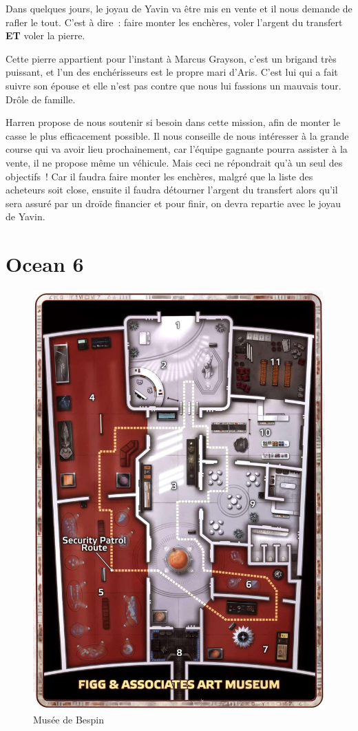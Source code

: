 \documentclass[a4paper,9pt,twoside,twocolumn,openany]{book}
\begin{document}
Dans quelques jours, le joyau de Yavin va être mis en vente et il nous demande de rafler le tout. C'est à dire\ : faire monter les enchères, voler l'argent du transfert \textbf{ET} voler la pierre.

Cette pierre appartient pour l'instant à Marcus Grayson, c'est un brigand très puissant, et l'un des enchérisseurs est le propre mari d’Aris. C'est lui qui a fait suivre son épouse et elle n'est pas contre que nous lui fassions un mauvais tour. Drôle de famille.

Harren propose de nous soutenir si besoin dans cette mission, afin de monter le casse le plus efficacement possible. Il nous conseille de nous intéresser à la grande course qui va avoir lieu prochainement, car l'équipe gagnante pourra assister à la vente, il ne propose même un véhicule. Mais ceci ne répondrait qu'à un seul des objectifs\ ! Car il faudra faire monter les enchères, malgré que la liste des acheteurs soit close, ensuite il faudra détourner l'argent du transfert alors qu'il sera assuré par un droïde financier et pour finir, on devra repartie avec le joyau de Yavin.


\section{Ocean 6}
\subtitle{20 janvier 2019}

\begin{figure}[]
\centering
    \includegraphics[width=.80\textwidth]{img/YavinMuseum.png}
    \caption{Musée de Bespin}
\end{figure}
\end{document}
